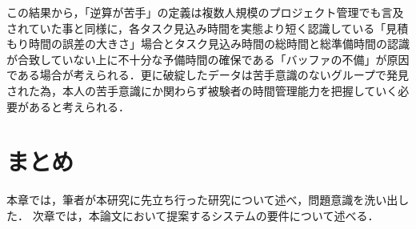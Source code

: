 この結果から，「逆算が苦手」の定義は複数人規模のプロジェクト管理でも言及されていた事と同様に，各タスク見込み時間を実態より短く認識している「見積もり時間の誤差の大きさ」場合とタスク見込み時間の総時間と総準備時間の認識が合致していない上に不十分な予備時間の確保である「バッファの不備」が原因である場合が考えられる．更に破綻したデータは苦手意識のないグループで発見された為，本人の苦手意識にか関わらず被験者の時間管理能力を把握していく必要があると考えられる．

\section{まとめ}
本章では，筆者が本研究に先立ち行った研究について述べ，問題意識を洗い出した．
次章では，本論文において提案するシステムの要件について述べる．